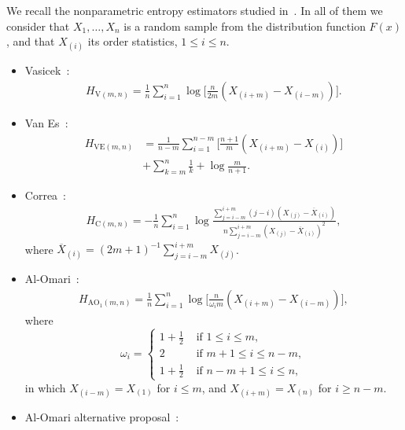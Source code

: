 \documentclass[journal]{IEEEtran}
\begin{document}
We recall the nonparametric entropy estimators studied in~\cite{AlOmari2016}. 
In all of them we consider that $X_1,\ldots,X_n$ is a random sample from the distribution function $F(x)$, and that $X_{(i)}$ its order statistics, $1\leq i\leq n$. 
\begin{itemize}
	\item Vasicek~\cite{Vasicek76}:
	 \begin{align}
	 	\label{HV}
		H_{\text{V}(m,n)}=\frac{1}{n} \sum_{i=1}^{n} \log \Big[\frac{n}{2 m}\left(X_{(i+m)}-X_{(i-m)}\right)\Big].
	\end{align}
	\item Van Es~\cite{VanEs92}:
	\begin{align}
		\label{HVE}
		H_{\text{VE}(m,n)}&=\frac{1}{n-m} \sum_{i=1}^{n-m}\Big[\frac{n+1}{m}\left(X_{(i+m)}-X_{(i)}\right)\Big] \nonumber\\
		        &+\sum_{k=m}^{n} \frac{1}{k}+\log \frac{m}{n+1}.
	\end{align}
	\item Correa~\cite{Correa95}:
	\begin{align}
		\label{HC}
		H_{\text{C}(m,n)}=-\frac{1}{n} \sum_{i=1}^{n} \log \frac{\sum_{j=i-m}^{i+m}(j-i)\left(X_{(j)}-\overline{X}_{(i)}\right)}{n \sum_{j=i-m}^{i+m}\left(X_{(j)}-\overline{X}_{(i)}\right)^{2}},
	\end{align}
where $\overline{X}_{(i)}=(2 m+1)^{-1} \sum_{j=i-m}^{i+m} X_{(j)}$.
	\item Al-Omari~\cite{AlOmari2014}:
	\begin{align}
	H_{\text{AO}_1(m,n)}=\frac{1}{n} \sum_{i=1}^{n} \log \Big[\frac{n}{\omega_{i} m}\left(X_{(i+m)}-X_{(i-m)}\right)\Big], 
		\label{AHE}
	\end{align}
	where
	\begin{equation*}
	\omega_{i}= \begin{cases}
		1+\frac{1}{2} & \text{ if }1 \leq i \leq m, \\
		2 & \text{ if } m+1 \leq i \leq n-m, \\
		1+\frac{1}{2} & \text{ if } n-m+1 \leq i \leq n,
				\end{cases}
	\end{equation*}
	in which $X_{(i-m)}=X_{(1)}$ for $i \leq m$, and $X_{(i+m)}=X_{(n)}$ for $i \geq n-m$.
	\item Al-Omari alternative proposal~\cite{AlOmari2016}:

\end{itemize}
\end{document}

